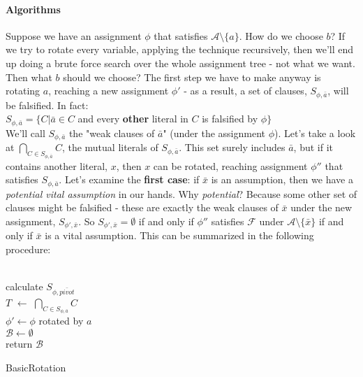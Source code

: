 \documentclass[]{article}
\begin{document}
	\paragraph{Algorithms}
	Suppose we have an assignment $ \phi $ that satisfies $ \mathcal{A}\setminus \{a\} $. How do we choose $ b $? If we try to rotate every variable, applying the technique recursively, then we'll end up doing a brute force search over the whole assignment tree - not what we want. Then what $ b $ should we choose? The first step we have to make anyway is rotating $ a $, reaching a new assignment $ \phi' $ - as a result, a set of clauses, $ S_{\phi,\bar{a}} $, will be falsified. In fact:\\ $ S_{\phi,\bar{a}} = \{ C | \bar{a} \in C $ and every \textbf{other} literal in $ C $ is  falsified by $ \phi \} $\\
	We'll call $ S_{\phi,\bar{a}} $ the "weak clauses of $ \bar{a} $" (under the assignment $ \phi $). Let's take a look at $ \bigcap_{C \in S_{\phi,\bar{a}}} C $, the mutual literals of $ S_{\phi,\bar{a}} $. This set surely includes $ \bar{a} $, but if it contains another literal, $ x $, then $ x $ can be rotated, reaching assignment $ \phi'' $ that satisfies $ S_{\phi,\bar{a}} $.
	 Let's examine the \textbf{first case}: if $ \bar{x} $ is an assumption, then we have a \textit{potential vital assumption} in our hands. Why \textit{potential}? Because some other set of clauses might be falsified - these are exactly the weak clauses of $ \bar{x} $ under the new assignment, $ S_{\phi', \bar{x}} $. So $  S_{\phi', \bar{x}}  = \emptyset $ if and only if $ \phi'' $ satisfies $ \mathcal{F} $ under $ \mathcal{A} \setminus \{\bar{x}\} $ if and only if $ \bar{x} $ is a vital assumption.
	 This can be summarized in the following procedure:\\\\
	 \begin{algorithm}[H]
	 	calculate $ S_{\phi,\bar{pivot}} $\\
	 	$ T $ $ \leftarrow $ $ \bigcap_{C \in S_{\phi,\bar{a}}} C $\\
	 	$ \phi' \leftarrow \phi $ rotated by $ a $\\
	 	$ \mathcal{B} \leftarrow \emptyset $  \\
	 	return $ \mathcal{B} $
	 	\caption{BasicRotation}
	 \end{algorithm}
 
\end{document}
